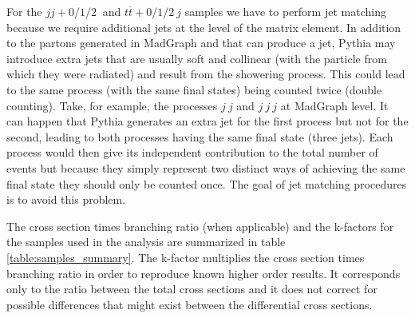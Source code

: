For the $jj+0/1/2 ~$ and $t\overline{t}+0/1/2 ~j$ samples we have to perform jet matching because we require additional jets at the level of the matrix element. In addition to the partons generated in MadGraph and that can produce a jet, Pythia may introduce extra jets that are usually soft and collinear (with the particle from which they were radiated) and result from the showering process. This could lead to the same process (with the same final states) being counted twice (double counting). Take, for example, the processes $j~j$ and  $j~j~j$ at MadGraph level. It can happen that Pythia generates an extra jet for the first process but not for the second, leading to both processes having the same final state (three jets). Each process would then give its independent contribution to the total number of events but because they simply represent two distinct ways of achieving the same final state they should only be counted once. The goal of jet matching procedures is to avoid this problem. 


The cross section times branching ratio (when applicable) and the k-factors for the samples used in the analysis are summarized in table \ref{table:samples_summary}. The k-factor multiplies the cross section times branching ratio in order to reproduce known higher order results. It corresponds only to the ratio between the total cross sections and it does not correct for possible differences that might exist between the differential cross sections.


